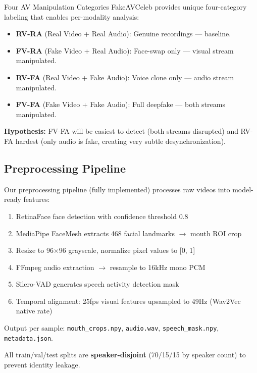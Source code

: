 \documentclass[12pt, letterpaper]{article}
\begin{document}
\begin{infobox}{Four AV Manipulation Categories}
FakeAVCeleb provides unique four-category labeling that enables per-modality analysis:
\begin{itemize}[leftmargin=1.5em, topsep=0pt]
    \item \textbf{RV-RA} (Real Video + Real Audio): Genuine recordings — baseline.
    \item \textbf{FV-RA} (Fake Video + Real Audio): Face-swap only — visual stream manipulated.
    \item \textbf{RV-FA} (Real Video + Fake Audio): Voice clone only — audio stream manipulated.
    \item \textbf{FV-FA} (Fake Video + Fake Audio): Full deepfake — both streams manipulated.
\end{itemize}
\textbf{Hypothesis:} FV-FA will be easiest to detect (both streams disrupted) and RV-FA hardest (only audio is fake, creating very subtle desynchronization).
\end{infobox}

\subsection{Preprocessing Pipeline}

Our preprocessing pipeline (fully implemented) processes raw videos into model-ready features:

\begin{enumerate}[itemsep=2pt, leftmargin=1.5em]
    \item RetinaFace face detection with confidence threshold 0.8
    \item MediaPipe FaceMesh extracts 468 facial landmarks $\rightarrow$ mouth ROI crop
    \item Resize to 96$\times$96 grayscale, normalize pixel values to [0, 1]
    \item FFmpeg audio extraction $\rightarrow$ resample to 16kHz mono PCM
    \item Silero-VAD generates speech activity detection mask
    \item Temporal alignment: 25fps visual features upsampled to 49Hz (Wav2Vec native rate)
\end{enumerate}

Output per sample: \texttt{mouth\_crops.npy}, \texttt{audio.wav}, \texttt{speech\_mask.npy}, \texttt{metadata.json}.

All train/val/test splits are \textbf{speaker-disjoint} (70/15/15 by speaker count) to prevent identity leakage.
\end{document}
